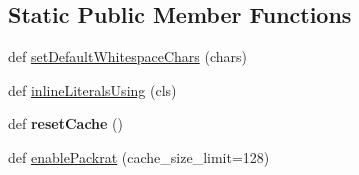 \subsection*{Static Public Member Functions}
\begin{DoxyCompactItemize}
\item 
def \hyperlink{classsetuptools_1_1__vendor_1_1pyparsing_1_1_parser_element_ace898842e0db5a5e509c8842426aab45}{set\+Default\+Whitespace\+Chars} (chars)
\item 
def \hyperlink{classsetuptools_1_1__vendor_1_1pyparsing_1_1_parser_element_ab48c9762534971e65dbb220d20c37990}{inline\+Literals\+Using} (cls)
\item 
\mbox{\label{classsetuptools_1_1__vendor_1_1pyparsing_1_1_parser_element_a8920748bf29370bc65690a1fb9016639}} 
def {\bfseries reset\+Cache} ()
\item 
def \hyperlink{classsetuptools_1_1__vendor_1_1pyparsing_1_1_parser_element_a93ea62f4f71af75efc5d024e262485b6}{enable\+Packrat} (cache\+\_\+size\+\_\+limit=128)
\end{DoxyCompactItemize}
